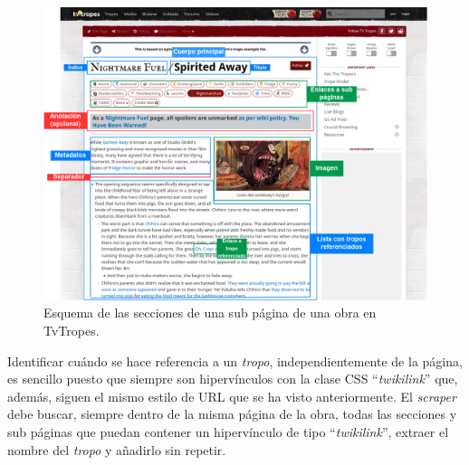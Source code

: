 \begin{figure}[!h]
  \centering
  \includegraphics[width=\textwidth]{img/esquema-subpagina.png}
  \caption{Esquema de las secciones de una sub página de una obra en TvTropes.}
  \label{fig:subpage}
\end{figure}

Identificar cuándo se hace referencia a un \textit{tropo}, independientemente de
la página, es sencillo puesto que siempre son hipervínculos con la clase CSS
``\textit{twikilink}'' que, además, siguen el mismo estilo de URL que se ha
visto anteriormente. El \textit{scraper} debe buscar, siempre dentro de la misma
página de la obra, todas las secciones y sub páginas que puedan contener un
hipervínculo de tipo ``\textit{twikilink}'', extraer el nombre del
\textit{tropo} y añadirlo sin repetir.


